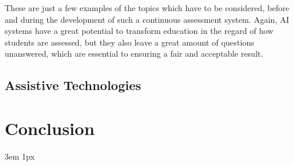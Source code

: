 \documentclass{Academic}
\begin{document}
    These are just a few examples of the topics which have to be considered, before and during the development of such a continuous assessment system. Again, AI systems have a great potential to transform education in the regard of how students are assessed, but they also leave a great amount of questions unanswered, which are essential to ensuring a fair and acceptable result.

    \subsection{Assistive Technologies}

    \section{Conclusion}

    \singlespacing
    \emergencystretch 3em
    \hfuzz 1px
    \printbibliography[heading=bibnumbered]




\end{document}
